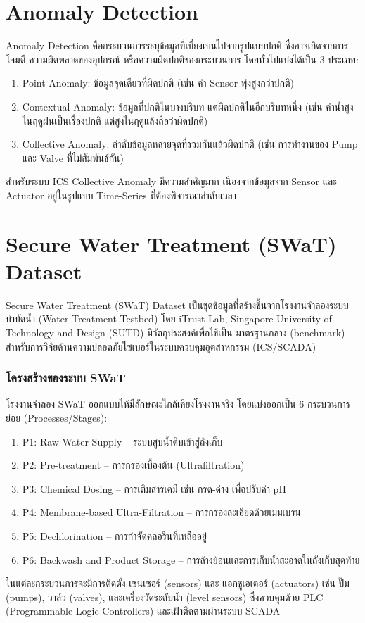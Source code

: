 \section{Anomaly Detection}
\hspace{2em} Anomaly Detection คือกระบวนการระบุข้อมูลที่เบี่ยงเบนไปจากรูปแบบปกติ ซึ่งอาจเกิดจากการโจมตี ความผิดพลาดของอุปกรณ์ หรือความผิดปกติของกระบวนการ โดยทั่วไปแบ่งได้เป็น 3 ประเภท:

\begin{enumerate}
  \item Point Anomaly: ข้อมูลจุดเดียวที่ผิดปกติ (เช่น ค่า Sensor พุ่งสูงกว่าปกติ)
  \item Contextual Anomaly: ข้อมูลที่ปกติในบางบริบท แต่ผิดปกติในอีกบริบทหนึ่ง (เช่น ค่าน้ำสูงในฤดูฝนเป็นเรื่องปกติ แต่สูงในฤดูแล้งถือว่าผิดปกติ)
  \item Collective Anomaly: ลำดับข้อมูลหลายจุดที่รวมกันแล้วผิดปกติ (เช่น การทำงานของ Pump และ Valve ที่ไม่สัมพันธ์กัน)
\end{enumerate}
\indent
สำหรับระบบ ICS Collective Anomaly มีความสำคัญมาก เนื่องจากข้อมูลจาก Sensor และ Actuator อยู่ในรูปแบบ Time-Series ที่ต้องพิจารณาลำดับเวลา

\section{ Secure Water Treatment (SWaT) Dataset}
\hspace{2em} Secure Water Treatment (SWaT) Dataset เป็นชุดข้อมูลที่สร้างขึ้นจากโรงงานจำลองระบบบำบัดน้ำ (Water Treatment Testbed) โดย iTrust Lab, Singapore University of Technology and Design (SUTD) มีวัตถุประสงค์เพื่อใช้เป็น มาตรฐานกลาง (benchmark) สำหรับการวิจัยด้านความปลอดภัยไซเบอร์ในระบบควบคุมอุตสาหกรรม (ICS/SCADA)

\subsubsection{โครงสร้างของระบบ SWaT}
โรงงานจำลอง SWaT ออกแบบให้มีลักษณะใกล้เคียงโรงงานจริง โดยแบ่งออกเป็น 6 กระบวนการย่อย (Processes/Stages):

\begin{enumerate}
  \item P1: Raw Water Supply – ระบบสูบน้ำดิบเข้าสู่ถังเก็บ
  \item P2: Pre-treatment – การกรองเบื้องต้น (Ultrafiltration)
  \item P3: Chemical Dosing – การเติมสารเคมี เช่น กรด-ด่าง เพื่อปรับค่า pH
  \item P4: Membrane-based Ultra-Filtration – การกรองละเอียดด้วยเมมเบรน
  \item P5: Dechlorination – การกำจัดคลอรีนที่เหลืออยู่
  \item P6: Backwash and Product Storage – การล้างย้อนและการเก็บน้ำสะอาดในถังเก็บสุดท้าย
\end{enumerate}
\indent
ในแต่ละกระบวนการจะมีการติดตั้ง เซนเซอร์ (sensors) และ แอกชูเอเตอร์ (actuators) เช่น ปั๊ม (pumps), วาล์ว (valves), และเครื่องวัดระดับน้ำ (level sensors) ซึ่งควบคุมด้วย PLC (Programmable Logic Controllers) และเฝ้าติดตามผ่านระบบ SCADA

